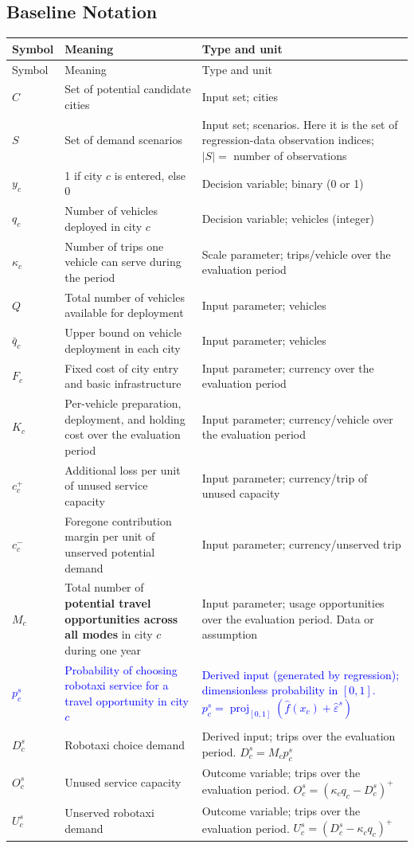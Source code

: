 \documentclass[10pt,a4paper]{article}
\newcommand{\proj}{\operatorname{proj}}
\begin{document}
\subsection{Baseline Notation}
{\footnotesize
\begin{longtable}{@{}L{0.10\textwidth}L{0.43\textwidth}L{0.41\textwidth}@{}}
\toprule Symbol & Meaning & Type and unit\\\midrule\endfirsthead
\toprule Symbol & Meaning & Type and unit\\\midrule\endhead\bottomrule\endlastfoot
$C$ & Set of potential candidate cities & Input set; cities\\
$S$ & Set of demand scenarios & Input set; scenarios. Here it is the set of regression-data observation indices; $|S|=$ number of observations\\
$y_c$ & 1 if city $c$ is entered, else 0 & Decision variable; binary (0 or 1)\\
$q_c$ & Number of vehicles deployed in city $c$ & Decision variable; vehicles (integer)\\
$\kappa_c$ & Number of trips one vehicle can serve during the period & Scale parameter; trips/vehicle over the evaluation period\\
$Q$ & Total number of vehicles available for deployment & Input parameter; vehicles\\
$\bar q_c$ & Upper bound on vehicle deployment in each city & Input parameter; vehicles\\
$F_c$ & Fixed cost of city entry and basic infrastructure & Input parameter; currency over the evaluation period\\
$K_c$ & Per-vehicle preparation, deployment, and holding cost over the evaluation period & Input parameter; currency/vehicle over the evaluation period\\
$c_c^+$ & Additional loss per unit of unused service capacity & Input parameter; currency/trip of unused capacity\\
$c_c^-$ & Foregone contribution margin per unit of unserved potential demand & Input parameter; currency/unserved trip\\
$M_c$ & Total number of \textbf{potential travel opportunities across all modes} in city $c$ during one year & Input parameter; usage opportunities over the evaluation period. Data or assumption\\
\textcolor{blue}{$p_c^s$} & \textcolor{blue}{Probability of choosing robotaxi service for a travel opportunity in city $c$} & \textcolor{blue}{Derived input (generated by regression); dimensionless probability in $[0,1]$. $p_c^s=\proj_{[0,1]}(\hat f(x_c)+\hat\varepsilon^s)$}\\
$D_c^s$ & Robotaxi choice demand & Derived input; trips over the evaluation period. $D_c^s=M_cp_c^s$\\
$O_c^s$ & Unused service capacity & Outcome variable; trips over the evaluation period. $O_c^s=(\kappa_cq_c-D_c^s)^+$\\
$U_c^s$ & Unserved robotaxi demand & Outcome variable; trips over the evaluation period. $U_c^s=(D_c^s-\kappa_cq_c)^+$\\
\end{longtable}}
\end{document}
